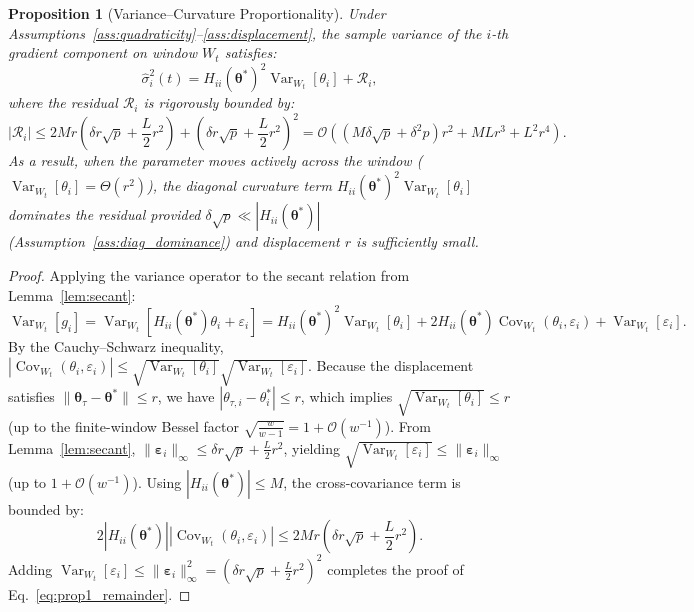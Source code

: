 \documentclass[11pt,a4paper]{article}
\newtheorem{proposition}{Proposition}
\begin{document}
\begin{proposition}[Variance--Curvature Proportionality]
\label{prop:variance_curvature}
Under Assumptions~\ref{ass:quadraticity}--\ref{ass:displacement}, the sample variance of the $i$-th gradient component on window $W_t$ satisfies:
\begin{equation}
\hat{\sigma}_i^2(t) = H_{ii}(\boldsymbol{\theta}^*)^2 \operatorname{Var}_{W_t}[\theta_i] + \mathcal{R}_i,
\end{equation}
where the residual $\mathcal{R}_i$ is rigorously bounded by:
\begin{equation}
|\mathcal{R}_i| \le 2 M r \left( \delta r \sqrt{p} + \frac{L}{2} r^2 \right) + \left( \delta r \sqrt{p} + \frac{L}{2} r^2 \right)^2 = \mathcal{O}\left( (M \delta \sqrt{p} + \delta^2 p) r^2 + M L r^3 + L^2 r^4 \right).
\label{eq:prop1_remainder}
\end{equation}
As a result, when the parameter moves actively across the window ($\operatorname{Var}_{W_t}[\theta_i] = \Theta(r^2)$), the diagonal curvature term $H_{ii}(\boldsymbol{\theta}^*)^2 \operatorname{Var}_{W_t}[\theta_i]$ dominates the residual provided $\delta \sqrt{p} \ll |H_{ii}(\boldsymbol{\theta}^*)|$ (Assumption~\ref{ass:diag_dominance}) and displacement $r$ is sufficiently small.
\end{proposition}

\begin{proof}
Applying the variance operator to the secant relation from Lemma~\ref{lem:secant}:
\begin{equation}
\operatorname{Var}_{W_t}[g_i] = \operatorname{Var}_{W_t}\left[ H_{ii}(\boldsymbol{\theta}^*) \theta_i + \varepsilon_i \right] = H_{ii}(\boldsymbol{\theta}^*)^2 \operatorname{Var}_{W_t}[\theta_i] + 2 H_{ii}(\boldsymbol{\theta}^*) \operatorname{Cov}_{W_t}(\theta_i, \varepsilon_i) + \operatorname{Var}_{W_t}[\varepsilon_i].
\end{equation}
By the Cauchy--Schwarz inequality, $|\operatorname{Cov}_{W_t}(\theta_i, \varepsilon_i)| \le \sqrt{\operatorname{Var}_{W_t}[\theta_i]} \sqrt{\operatorname{Var}_{W_t}[\varepsilon_i]}$. Because the displacement satisfies $\|\boldsymbol{\theta}_\tau - \boldsymbol{\theta}^*\| \le r$, we have $|\theta_{\tau,i} - \theta_i^*| \le r$, which implies $\sqrt{\operatorname{Var}_{W_t}[\theta_i]} \le r$ (up to the finite-window Bessel factor $\sqrt{\frac{w}{w-1}} = 1 + \mathcal{O}(w^{-1})$). From Lemma~\ref{lem:secant}, $\|\boldsymbol{\varepsilon}_i\|_\infty \le \delta r \sqrt{p} + \frac{L}{2} r^2$, yielding $\sqrt{\operatorname{Var}_{W_t}[\varepsilon_i]} \le \|\boldsymbol{\varepsilon}_i\|_\infty$ (up to $1 + \mathcal{O}(w^{-1})$). Using $|H_{ii}(\boldsymbol{\theta}^*)| \le M$, the cross-covariance term is bounded by:
\begin{equation}
2 |H_{ii}(\boldsymbol{\theta}^*)| |\operatorname{Cov}_{W_t}(\theta_i, \varepsilon_i)| \le 2 M r \left( \delta r \sqrt{p} + \frac{L}{2} r^2 \right).
\end{equation}
Adding $\operatorname{Var}_{W_t}[\varepsilon_i] \le \|\boldsymbol{\varepsilon}_i\|_\infty^2 = (\delta r \sqrt{p} + \frac{L}{2} r^2)^2$ completes the proof of Eq.~\eqref{eq:prop1_remainder}.
\end{proof}
\end{document}
